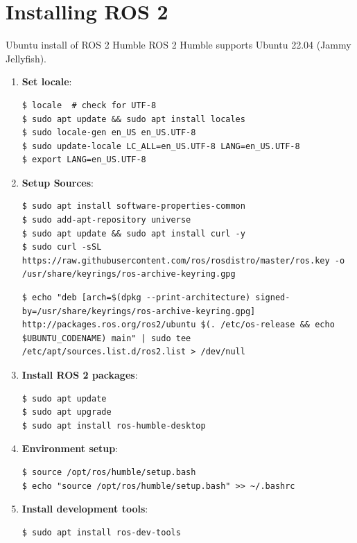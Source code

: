 \section{Installing ROS 2}

\begin{frame}{Ubuntu install of ROS 2 Humble}
    ROS 2 Humble supports Ubuntu 22.04 (Jammy Jellyfish).

    \begin{enumerate}
        \item \textbf{Set locale}:
              \begin{lstlisting}[language=shell]
$ locale  # check for UTF-8
$ sudo apt update && sudo apt install locales
$ sudo locale-gen en_US en_US.UTF-8
$ sudo update-locale LC_ALL=en_US.UTF-8 LANG=en_US.UTF-8
$ export LANG=en_US.UTF-8
\end{lstlisting}

        \item \textbf{Setup Sources}:
              \begin{lstlisting}[language=shell]
$ sudo apt install software-properties-common
$ sudo add-apt-repository universe
$ sudo apt update && sudo apt install curl -y
$ sudo curl -sSL https://raw.githubusercontent.com/ros/rosdistro/master/ros.key -o /usr/share/keyrings/ros-archive-keyring.gpg
\end{lstlisting}

              \framebreak

              \begin{lstlisting}[language=shell]
$ echo "deb [arch=$(dpkg --print-architecture) signed-by=/usr/share/keyrings/ros-archive-keyring.gpg] http://packages.ros.org/ros2/ubuntu $(. /etc/os-release && echo $UBUNTU_CODENAME) main" | sudo tee /etc/apt/sources.list.d/ros2.list > /dev/null
\end{lstlisting}

        \item \textbf{Install ROS 2 packages}:
              \begin{lstlisting}[language=shell]
$ sudo apt update
$ sudo apt upgrade
$ sudo apt install ros-humble-desktop
\end{lstlisting}

        \item \textbf{Environment setup}:
              \begin{lstlisting}[language=shell]
$ source /opt/ros/humble/setup.bash
$ echo "source /opt/ros/humble/setup.bash" >> ~/.bashrc
\end{lstlisting}

        \item \textbf{Install development tools}:
              \begin{lstlisting}[language=shell]
$ sudo apt install ros-dev-tools
\end{lstlisting}
    \end{enumerate}
\end{frame}

